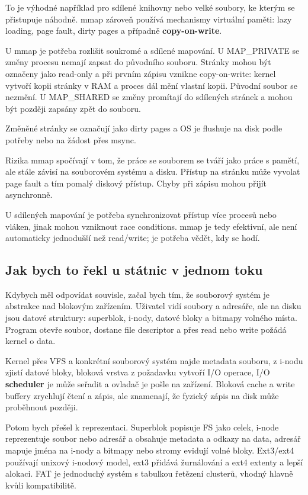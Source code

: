 \documentclass[11pt,a4paper]{article}
\begin{document}
To je výhodné například pro sdílené knihovny nebo velké soubory, ke kterým se přistupuje náhodně. mmap zároveň používá mechanismy virtuální paměti: lazy loading, page fault, dirty pages a případně \textbf{copy-on-write}.

U mmap je potřeba rozlišit soukromé a sdílené mapování. U MAP\_PRIVATE se změny procesu nemají zapsat do původního souboru. Stránky mohou být označeny jako read-only a při prvním zápisu vznikne copy-on-write: kernel vytvoří kopii stránky v RAM a proces dál mění vlastní kopii. Původní soubor se nezmění. U MAP\_SHARED se změny promítají do sdílených stránek a mohou být později zapsány zpět do souboru.

Změněné stránky se označují jako dirty pages a OS je flushuje na disk podle potřeby nebo na žádost přes msync.

Rizika mmap spočívají v tom, že práce se souborem se tváří jako práce s pamětí, ale stále závisí na souborovém systému a disku. Přístup na stránku může vyvolat page fault a tím pomalý diskový přístup. Chyby při zápisu mohou přijít asynchronně.

U sdílených mapování je potřeba synchronizovat přístup více procesů nebo vláken, jinak mohou vzniknout race conditions. mmap je tedy efektivní, ale není automaticky jednodušší než read/write; je potřeba vědět, kdy se hodí.

\subsection*{Jak bych to řekl u státnic v jednom toku}

Kdybych měl odpovídat souvisle, začal bych tím, že souborový systém je abstrakce nad blokovým zařízením. Uživatel vidí soubory a adresáře, ale na disku jsou datové struktury: superblok, i-nody, datové bloky a bitmapy volného místa. Program otevře soubor, dostane file descriptor a přes read nebo write požádá kernel o data.

Kernel přes VFS a konkrétní souborový systém najde metadata souboru, z i-nodu zjistí datové bloky, bloková vrstva z požadavku vytvoří I/O operace, I/O \textbf{scheduler} je může seřadit a ovladač je pošle na zařízení. Bloková cache a write buffery zrychlují čtení a zápis, ale znamenají, že fyzický zápis na disk může proběhnout později.

Potom bych přešel k reprezentaci. Superblok popisuje FS jako celek, i-node reprezentuje soubor nebo adresář a obsahuje metadata a odkazy na data, adresář mapuje jména na i-nody a bitmapy nebo stromy evidují volné bloky. Ext3/ext4 používají unixový i-nodový model, ext3 přidává žurnálování a ext4 extenty a lepší alokaci. FAT je jednoduchý systém s tabulkou řetězení clusterů, vhodný hlavně kvůli kompatibilitě.
\end{document}
